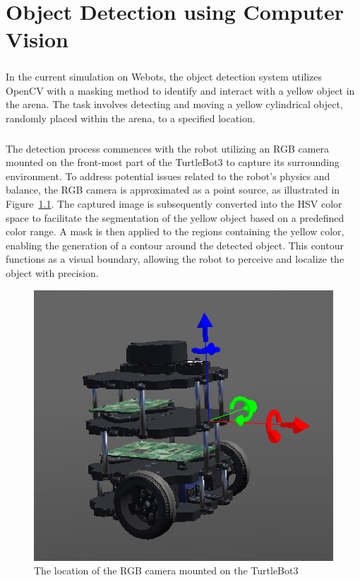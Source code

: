 \chapter{Object Detection using Computer Vision}

\paragraph*{}
In the current simulation on Webots, the object detection system utilizes OpenCV with a masking method to identify and interact with a yellow object in the arena. The task involves detecting and moving a yellow cylindrical object, randomly placed within the arena, to a specified location.

\paragraph*{}
The detection process commences with the robot utilizing an RGB camera mounted on the front-most part of the TurtleBot3 to capture its surrounding environment. To address potential issues related to the robot's physics and balance, the RGB camera is approximated as a point source, as illustrated in Figure~\ref{fig:object detection figure 1}. The captured image is subsequently converted into the HSV color space to facilitate the segmentation of the yellow object based on a predefined color range. A mask is then applied to the regions containing the yellow color, enabling the generation of a contour around the detected object. This contour functions as a visual boundary, allowing the robot to perceive and localize the object with precision.


\begin{figure}[H]
    \centering
    \includegraphics[width=0.5\linewidth]{assets/images/object_detection/fig1.png}
    \caption{The location of the RGB camera mounted on the TurtleBot3}
    \label{fig:object detection figure 1} 
\end{figure}


